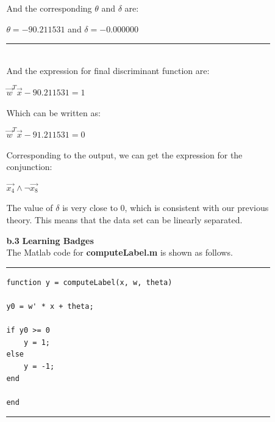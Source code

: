 \begin{enumerate}
\begin{enumerate}
\begin{enumerate}
\begin{center}
\end{center}


And the corresponding $\theta$ and $\delta$ are: \\
\begin{center}
$\theta = -90.211531$ and $\delta = -0.000000$\\
\end{center}
\rule{400pt}{2pt}\\

And the expression for final discriminant function are:\\
\begin{center}
$\vec{w}^T \vec{x} - 90.211531 = 1$
\end{center}
Which can be written as:\\
\begin{center}
$\vec{w}^T \vec{x} - 91.211531 = 0$
\end{center}

Corresponding to the output, we can get the expression for the conjunction:\\

\begin{center}
$\vec{x_4} \wedge \neg \vec{x_8}$ \\
\end{center}

The value of $\delta$ is very close to 0, which is consistent with our previous theory. This means that the data set can be linearly separated.\\

\item[{\bf b.3 }] {\bf Learning Badges}\\

The Matlab code for {\bf computeLabel.m} is shown as follows. \\

\rule{400pt}{2pt}
\begin{lstlisting}
function y = computeLabel(x, w, theta)

y0 = w' * x + theta;

if y0 >= 0
    y = 1;
else
    y = -1;
end

end

\end{lstlisting}
\rule{400pt}{2pt}\\


\end{enumerate}
\end{enumerate}
\end{enumerate}
